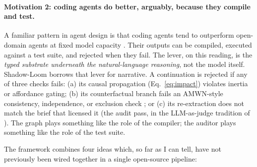 \documentclass[11pt]{article}
\begin{document}
\paragraph{Motivation 2: coding agents do better, arguably,
because they compile and test.} A familiar pattern in agent
design is that coding agents tend to outperform open-domain
agents at fixed model capacity \citep{jimenez2024swebench}.
Their outputs can be compiled, executed against a test suite,
and rejected when they fail. The
lever, on this reading, is the \emph{typed substrate underneath
the natural-language reasoning}, not the model itself.
Shadow-Loom borrows that lever for narrative. A continuation is
rejected if any of three checks fails: (a) its causal
propagation (Eq.~\ref{eq:impact}) violates inertia or
affordance gating; (b) its counterfactual branch fails an
AMWN-style consistency, independence, or exclusion check
\citep{correa2025amwn}; or (c) its re-extraction does not match
the brief that licensed it (the audit pass, in the
LLM-as-judge tradition of
\citealp{bai2022constitutional,madaan2023selfrefine,gu2024judge}).
The graph plays something like the role of the compiler; the
auditor plays something like the role of the test suite.

The framework combines four ideas which, so far as I can tell,
have not previously been wired together in a single open-source
pipeline:
\end{document}
